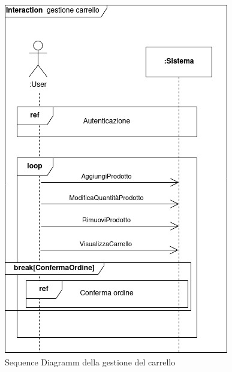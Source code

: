 \documentclass{article}
\begin{document}
\newpage
\begin{figure}[h!]
	\centering
	\includegraphics[width=\textwidth]{SDGestioneCarrello.jpg}
	\caption{Sequence Diagramm della gestione del carrello}
	\label{fig:SDGestioneCarrello}
\end{figure}
\end{document}
